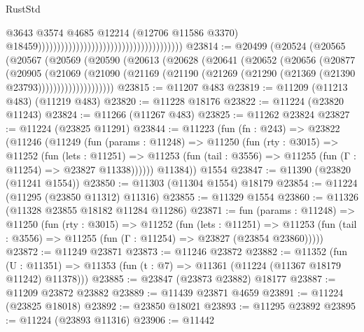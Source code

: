 \begin{lexlean}{RustStd}
\begin{coremodule}
                                                                                @3643
                                                                                @3574
                                                                                @4685
                                                                                @12214
                                                                                (@12706
                                                                                  @11586
                                                                                  @3370)
                                                                                @18459))))))))))))))))))))))))))))))))))))))
@23814 := @20499
    (@20524
      (@20565
        (@20567
          (@20569
            (@20590
              (@20613
                (@20628
                  (@20641
                    (@20652
                      (@20656
                        (@20877
                          (@20905
                            (@21069
                              (@21090
                                (@21169
                                  (@21190 (@21269 (@21290 (@21369 (@21390 @23793))))))))))))))))))))
@23815 := @11207 @483
@23819 := @11209 (@11213 @483) (@11219 @483)
@23820 := @11228 @18176
@23822 := @11224 (@23820 @11243)
@23824 := @11266 (@11267 @483)
@23825 := @11262 @23824
@23827 := @11224 (@23825 @11291)
@23844 := @11223
    (fun (fn : @243) =>
    @23822
      (@11246
        (@11249
          (fun (params : @11248) =>
          @11250
            (fun (rty : @3015) =>
            @11252
              (fun (lets : @11251) =>
              @11253 (fun (tail : @3556) => @11255 (fun (Γ : @11254) => @23827 @11338))))))
        @11384))
    @1554
@23847 := @11390 (@23820 (@11241 @1554))
@23850 := @11303 (@11304 @1554) @18179
@23854 := @11224 (@11295 (@23850 @11312) @11316)
@23855 := @11329 @1554
@23860 := @11326 (@11328 @23855 @18182 @11284 @11286)
@23871 := fun (params : @11248) =>
  @11250
    (fun (rty : @3015) =>
    @11252
      (fun (lets : @11251) =>
      @11253 (fun (tail : @3556) => @11255 (fun (Γ : @11254) => @23827 (@23854 @23860)))))
@23872 := @11249 @23871
@23873 := @11246 @23872
@23882 := @11352
    (fun (U : @11351) => @11353 (fun (t : @7) => @11361 (@11224 (@11367 @18179 @11242) @11378)))
@23885 := @23847 (@23873 @23882) @18177
@23887 := @11209 @23872 @23882
@23889 := @11439 @23871 @4659
@23891 := @11224 (@23825 @18018)
@23892 := @23850 @18021
@23893 := @11295 @23892
@23895 := @11224 (@23893 @11316)
@23906 := @11442

\end{coremodule}
\end{lexlean}
